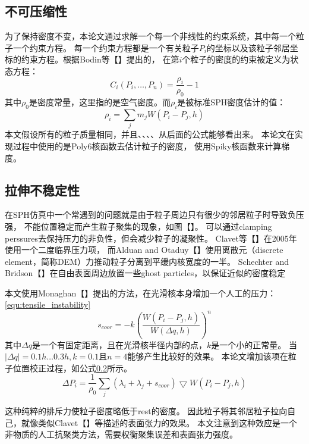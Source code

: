 \subsection{不可压缩性}
为了保持密度不变，本论文通过求解一个每一个非线性的约束系统，其中每一个粒子一个约束方程。
每一个约束方程都是一个有关粒子$P_i$的坐标以及该粒子邻居坐标的约束方程。根据Bodin等【】提出的，
在第$i$个粒子的密度的约束被定义为状态方程：
\begin{equation}
\label{equ:density_constraint}
C_i(P_i,\dots,P_n) = \frac{\rho_i}{\rho_0} - 1
\end{equation}
其中$\rho_0$是密度常量，这里指的是空气密度。而$\rho_i$是被标准SPH密度估计的值：
\begin{equation}
\label{equ:sph_density}
\rho_i=\sum_jm_jW(P_i-P_j,h)
\end{equation}
本文假设所有的粒子质量相同，并且、、、、从后面的公式能够看出来。
本论文在实现过程中使用的是Poly6核函数去估计粒子的密度，
使用Spiky核函数来计算梯度。


\subsection{拉伸不稳定性}
在SPH仿真中一个常遇到的问题就是由于粒子周边只有很少的邻居粒子时导致负压强，
不能位置稳定而产生粒子聚集的现象，如图【】。
可以通过clamping perssures去保持压力的非负性，但会减少粒子的凝聚性。
Clavet等【】在2005年使用一个二度临界压力项，
而Alduan and Otaduy【】使用离散元（discrete element，简称DEM）力推动粒子分离到平缓内核宽度的一半。
Schechter and Bridson【】在自由表面周边放置一些ghost particles，以保证近似的密度稳定

本文使用Monaghan【】提出的方法，在光滑核本身增加一个人工的压力：\ref{equ:tensile_instability}
\begin{equation}
\label{equ:tensile_instability}
s_{coor}=-k\left(\frac{W(P_i-P_j,h)}{W(\Delta{}q,h)}\right)^n
\end{equation}
其中$\Delta{}q$是一个有固定距离，且在光滑核半径内部的点，$k$是一个小的正常量。
当$|\Delta{}q|=0.1h\dots{}0.3h,k=0.1$且$n=4$能够产生比较好的效果。
本论文增加该项在粒子位置校正过程，如公式\ref{}所示。
\begin{equation}
\label{equ:update_position}
\Delta{}P_i=\frac{1}{\rho_0}\sum_j(\lambda_i+\lambda_j+s_{coor})\bigtriangledown{}W(P_i-P_j,h)
\end{equation}

这种纯粹的排斥力使粒子密度略低于rest的密度。
因此粒子将其邻居粒子拉向自己，就像类似Clavet【】等描述的表面张力的效果。
本文注意到这种效应是一个非物质的人工抗聚类方法，需要权衡聚集误差和表面张力强度。


